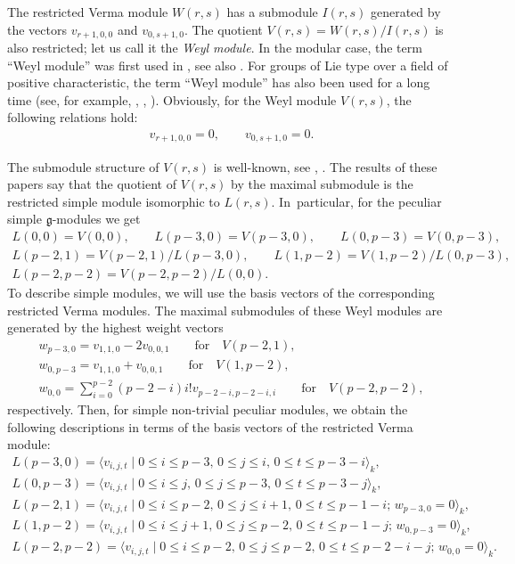 \documentclass[pdftex]{sigma}%
\numberwithin{equation}{section}
\begin{document}
The restricted Verma module $W(r,s)$ has a submodule $I(r,s)$ generated by the vectors $v_{r+1,0,0}$ and $v_{0,s+1,0}$.
The quotient $V(r,s)=W(r,s)/I(r,s)$ is also restricted; let us call it the {\it Weyl module}. In the modular case, the term ``Weyl module'' was first used in \cite[p.~321]{S80}, see also \cite[p.~59]{F88}. For groups of Lie type over a field of positive characteristic, the term ``Weyl module'' has also been used for a long time (see, for example, \cite[p.~213]{CaL74}, \cite[p.~262]{Humph80}, \cite[p.~291]{Jan80}). Obviously, for the Weyl module $V(r,s)$, the following relations hold:
\begin{gather*}
v_{r+1,0,0}=0,\qquad v_{0,s+1,0}=0.
\end{gather*}

The submodule structure of $V(r,s)$ is well-known, see \cite[p.~484]{B67}, \cite[pp.~151 and~157]{Rud78}. The results of these papers say that the quotient of $V(r,s)$ by the
maximal submodule is the restricted simple module isomorphic to $L(r,s)$. In~particular, for the peculiar simple $\mathfrak{g}$-modules we get
\begin{gather*}
L(0,0)=V(0,0),\qquad L(p-3,0)=V(p-3,0),\qquad L(0,p-3)=V(0,p-3),
\\
L(p-2,1)=V(p-2,1)/L(p-3,0),\qquad L(1,p-2)=V(1,p-2)/L(0,p-3),
\\
L(p-2,p-2)=V(p-2,p-2)/L(0,0).
\end{gather*}
To describe simple modules, we will use the basis vectors of the corresponding restricted Verma modules. The maximal submodules of these Weyl modules are generated by the highest weight vectors
\begin{gather*}
w_{p-3,0}=v_{1,1,0}-2v_{0,0,1}\qquad \text{for}\quad V(p-2,1),
\\
w_{0,p-3}=v_{1,1,0}+v_{0,0,1}\qquad \text{for}\quad V(1,p-2),
\\
w_{0,0}=\sum_{i=0}^{p-2}(p-2-i)i!v_{p-2-i,p-2-i,i}\qquad \text{for}\quad V(p-2,p-2),
\end{gather*}
respectively.
Then, for simple non-trivial peculiar modules, we obtain the following descriptions in terms of the basis vectors of the restricted Verma module:
\begin{gather*}
L(p-3,0)=\langle v_{i,j,t}\mid 0\leq i\leq p-3,\,0\leq j\leq i,\,0\leq t\leq p-3-i\rangle_{k},
\\
L(0,p-3)=\langle v_{i,j,t}\mid 0\leq i\leq j,\,0\leq j\leq p-3,\,0\leq t\leq p-3-j\rangle_{k},
\\
L(p-2,1)=\langle v_{i,j,t}\mid 0\leq i\leq p-2,\,0\leq j\leq i+1,\,0\leq t\leq p-1-i;\,w_{p-3,0}=0\rangle_{k},
\\
L(1,p-2)=\langle v_{i,j,t}\mid 0\leq i\leq j+1,\,0\leq j\leq p-2,\,0\leq t\leq p-1-j;\,w_{0,p-3}=0\rangle_{k},
\\
L(p-2,p-2)=\langle v_{i,j,t}\mid 0\leq i\leq p-2,\,0\leq j\leq p-2,\,0\leq t\leq p-2-i-j;\,w_{0,0}=0\rangle_{k}.
\end{gather*}
\end{document}
